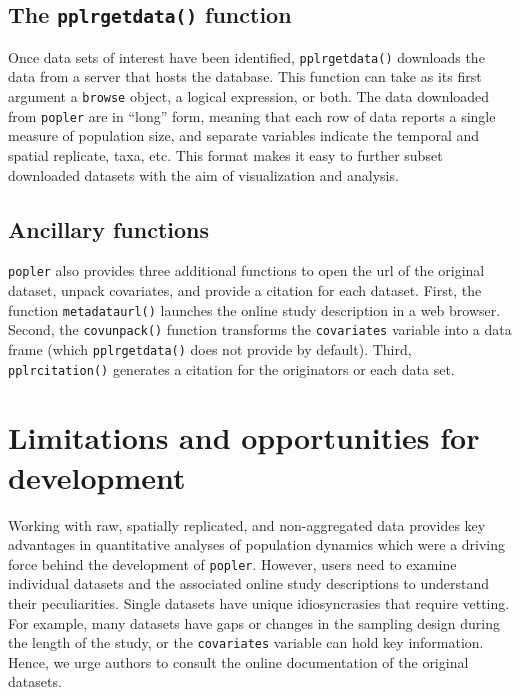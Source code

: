 \documentclass{article}\usepackage[]{graphicx}\usepackage[]{color}
\begin{document}
\subsection*{The \texttt{pplr\textunderscore get\textunderscore data()} function}

Once data sets of interest have been identified, \texttt{pplr\textunderscore get\textunderscore data()} downloads the data from a server that hosts the database. This function can take as its first argument a \texttt{browse} object, a logical expression, or both. The data downloaded from \texttt{popler} are in ``long'' form, meaning that each row of data reports a single measure of population size, and separate variables indicate the temporal and spatial replicate, taxa, etc. This format makes it easy to further subset downloaded datasets with the aim of visualization and analysis. 

\subsection*{Ancillary functions}
\texttt{popler} also provides three additional functions to open the url of the original dataset, unpack covariates, and provide a citation for each dataset. First, the function \texttt{metadata\textunderscore url()} launches the online study description in a web browser. Second, the \texttt{cov\textunderscore unpack()} function transforms the \texttt{covariates} variable into a data frame (which \texttt{pplr\textunderscore get\textunderscore data()} does not provide by default). Third, \texttt{pplr\textunderscore citation()} generates a citation for the originators or each data set. 

\section*{Limitations and opportunities for development}
Working with raw, spatially replicated, and non-aggregated data provides key advantages in quantitative analyses of population dynamics which were a driving force behind the development of \texttt{popler}. However, users need to examine individual datasets and the associated online study descriptions to understand their peculiarities. Single datasets have unique idiosyncrasies that require vetting. For example, many datasets have gaps or changes in the sampling design during the length of the study, or the  \texttt{covariates} variable can hold key information. Hence, we urge authors to consult the online documentation of the original datasets.
\end{document}
